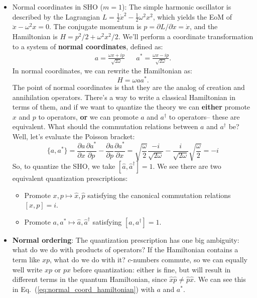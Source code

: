 \documentclass[12pt, oneside]{article}   	%
\theoremstyle{definition}
\begin{document}
\begin{itemize}
	\item Normal coordinates in SHO ($m = 1$): The simple harmonic oscillator is described by the Lagrangian $L = \frac{1}{2} \dot x^2 - \frac{1}{2} \omega^2 x^2$, which yields the EoM of $\ddot x - \omega^2 x = 0$. The conjugate momentum is $p = \partial L / \partial \dot{x} = \dot x$, and the Hamiltonian is $H = p^2 / 2 + \omega^2 x^2 / 2$. We'll perform a coordinate transformation to a system of \textbf{normal coordinates}, defined as:
	\begin{align}
		a = \frac{\omega x + i p}{\sqrt{2\omega}} && a^* = \frac{\omega x - i p}{\sqrt{2\omega}}.
	\end{align}
	In normal coordinates, we can rewrite the Hamiltonian as:
	\begin{equation}
		H = \omega a a^*. \label{eq:normal_coord_hamiltonian}
	\end{equation}
	The point of normal coordinates is that they are the analog of creation and annihilation operators. There's a way to write a classical Hamiltonian in terms of them, and if we want to quantize the theory we can \textbf{either} promote $x$ and $p$ to operators, \textbf{or} we can promote $a$ and $a^\dagger$ to operators-- these are equivalent. What should the commutation relations between $a$ and $a^\dagger$ be? Well, let's evaluate the Poisson bracket:
	\begin{equation}
		\{a, a^*\} = \frac{\partial a}{\partial x} \frac{\partial a^*}{\partial p} - \frac{\partial a}{\partial p} \frac{\partial a^*}{\partial x} = \sqrt{\frac{\omega}{2}} \frac{-i}{\sqrt{2\omega}} - \frac{i}{\sqrt{2\omega}} \sqrt{\frac{\omega}{2}} = -i
	\end{equation}
	So, to quantize the SHO, we take $[\hat a, \hat a^\dagger] = 1$. We see there are two equivalent quantization prescriptions:
	\begin{itemize}
		\item Promote $x, p\mapsto \hat x, \hat p$ satisfying the canonical commutation relations $[x, p] = i$. 
		\item Promote $a, a^*\mapsto \hat a, \hat a^\dagger$ satisfying $[a, a^\dagger] = 1$. 
	\end{itemize}
	
	
	\item \textbf{Normal ordering}: The quantization prescription has one big ambiguity: what do we do with products of operators? If the Hamiltonian contains a term like $xp$, what do we do with it? $c$-numbers commute, so we can equally well write $xp$ or $px$ before quantization: either is fine, but will result in different terms in the quantum Hamiltonian, since $\hat x \hat p\neq \hat p\hat x$. We can see this in Eq.~(\ref{eq:normal_coord_hamiltonian}) with $a$ and $a^*$. 
	

\end{itemize}
\end{document}
